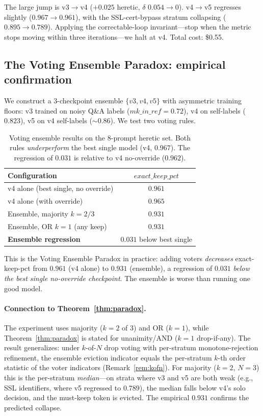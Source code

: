 The large jump is v3$\to$v4 ($+0.025$ heretic, $\delta$ $0.054\to0$). v4$\to$v5
regresses slightly ($0.967\to0.961$), with the SSL-cert-bypass stratum
collapsing ($0.895\to0.789$). Applying the correctable-loop invariant---stop
when the metric stops moving within three iterations---we halt at v4.
Total cost: \$0.55.

\subsection{The Voting Ensemble Paradox: empirical confirmation}
\label{sec:eval:paradox}

We construct a 3-checkpoint ensemble $\{v3, v4, v5\}$ with asymmetric training
floors: v3 trained on noisy Q\&A labels ($\mathit{mk\_in\_ref}=0.72$), v4 on
self-labels ($0.823$), v5 on v4 self-labels (${\sim}0.86$). We test two
voting rules.

\begin{table}[h]
\centering
\caption{Voting ensemble results on the 8-prompt heretic set. Both rules
\emph{underperform} the best single model (v4, $0.967$). The regression of
$0.031$ is relative to v4 no-override ($0.962$).}
\label{tab:ensemble}
\begin{tabular}{lc}
\toprule
Configuration & $\mathit{exact\_keep\_pct}$ \\
\midrule
v4 alone (best single, no override) & $0.961$ \\
v4 alone (with override)            & $0.965$ \\
\midrule
Ensemble, majority $k{=}2/3$        & $0.931$ \\
Ensemble, OR $k{=}1$ (any keep)     & $0.931$ \\
\midrule
\textbf{Ensemble regression}        & $\mathbf{0.031}$ below best single \\
\bottomrule
\end{tabular}
\end{table}

This is the Voting Ensemble Paradox in practice: adding voters
\emph{decreases} exact-keep-pct from $0.961$ (v4 alone) to $0.931$
(ensemble), a regression of $0.031$ \emph{below the best single
no-override checkpoint}. The ensemble is worse than running one good model.

\paragraph{Connection to Theorem~\ref{thm:paradox}.} The experiment uses
majority ($k{=}2$ of $3$) and OR ($k{=}1$), while Theorem~\ref{thm:paradox}
is stated for unanimity/AND ($k{=}1$ drop-if-any). The result generalizes:
under $k$-of-$N$ drop voting with per-stratum monotone-rejection
refinement, the ensemble eviction indicator equals the per-stratum $k$-th
order statistic of the voter indicators (Remark~\ref{rem:kofn}). For
majority ($k{=}2$, $N{=}3$) this is the per-stratum \emph{median}---on strata
where v3 and v5 are both weak (e.g., SSL identifiers, where v5 regressed to
$0.789$), the median falls below v4's solo decision, and the must-keep token
is evicted. The empirical $0.931$ confirms the predicted collapse.

